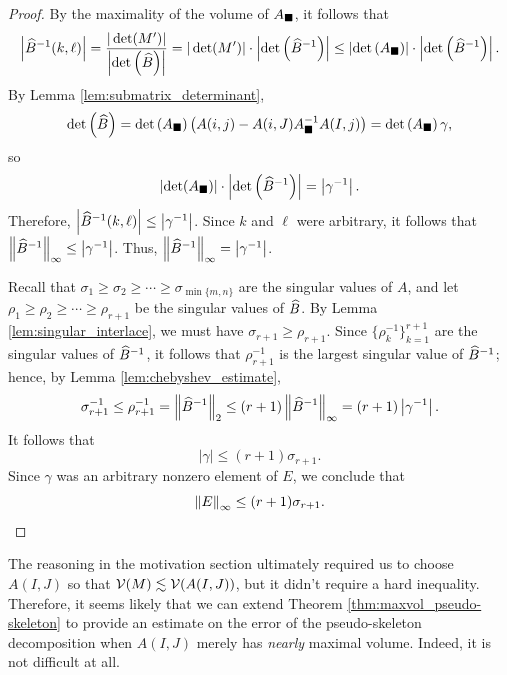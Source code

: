 \documentclass{article}
\begin{document}
\begin{proof}
		By the maximality of the volume of $A_\blacksquare$, it follows that
		\begin{equation}
			\left|\widehat{B}^{-1}(k,\ell)\right| = \frac{|\det(M')|}{\left|\det\left(\widehat{B}\right)\right|} =|\det(M')|\cdot \left|\det\left(\widehat{B}^{-1}\right)\right| \le \left|\det\left(A_\blacksquare\right)\right|\cdot \left|\det\left(\widehat{B}^{-1}\right)\right|.
		\end{equation}
		By Lemma \ref{lem:submatrix_determinant},
		\begin{equation}
			\det\left(\widehat{B}\right) = \det\left(A_\blacksquare\right)\left(A(i,j)-A(i,J)A_\blacksquare^{-1}A(I,j)\right) = \det\left(A_\blacksquare\right)\gamma,
		\end{equation}
		so
		\begin{equation}
			\left|\det(A_\blacksquare)\right|\cdot \left|\det\left(\widehat{B}^{-1}\right)\right| = \left|\gamma^{-1}\right|.
		\end{equation}
		Therefore, $\left|\widehat{B}^{-1}(k,\ell)\right| \le \left|\gamma^{-1}\right|$. Since $k$ and $\ell$ were arbitrary, it follows that $\left\lVert \widehat{B}^{-1} \right\rVert_\infty \le \left|\gamma^{-1}\right|$. Thus, $\left\lVert \widehat{B}^{-1} \right\rVert_\infty = \left|\gamma^{-1}\right|$.
		
		Recall that $\sigma_1 \ge \sigma_2 \ge \cdots \ge \sigma_{\min\{m,n\}}$ are the singular values of $A$, and let $\rho_1 \ge \rho_2 \ge \cdots \ge \rho_{r+1}$ be the singular values of $\widehat{B}$. By Lemma \ref{lem:singular_interlace}, we must have $\sigma_{r+1} \ge \rho_{r+1}$. Since $\{\rho_k^{-1}\}_{k=1}^{r+1}$ are the singular values of $\widehat{B}^{-1}$, it follows that $\rho_{r+1}^{-1}$ is the largest singular value of $\widehat{B}^{-1}$; hence, by Lemma \ref{lem:chebyshev_estimate},
		\begin{equation}
			\sigma_{r+1}^{-1} \le \rho_{r+1}^{-1} = \left\lVert \widehat{B}^{-1} \right\rVert_2 \le (r+1)\left\lVert \widehat{B}^{-1} \right\rVert_\infty = (r+1)\left|\gamma^{-1}\right|.
		\end{equation}
		It follows that
		\begin{equation}
			|\gamma| \le (r+1)\sigma_{r+1}.
		\end{equation}
		Since $\gamma$ was an arbitrary nonzero element of $E$, we conclude that
		\begin{equation}
			\left\lVert E \right\rVert_\infty \le (r+1)\sigma_{r+1}.
		\end{equation}
	\end{proof}
	
	The reasoning in the motivation section ultimately required us to choose $A(I,J)$ so that $\mathcal{V}(M) \lesssim \mathcal{V}(A(I,J))$, but it didn't require a hard inequality. Therefore, it seems likely that we can extend Theorem \ref{thm:maxvol_pseudo-skeleton} to provide an estimate on the error of the pseudo-skeleton decomposition when $A(I,J)$ merely has \textit{nearly} maximal volume. Indeed, it is not difficult at all.
	
\end{document}
